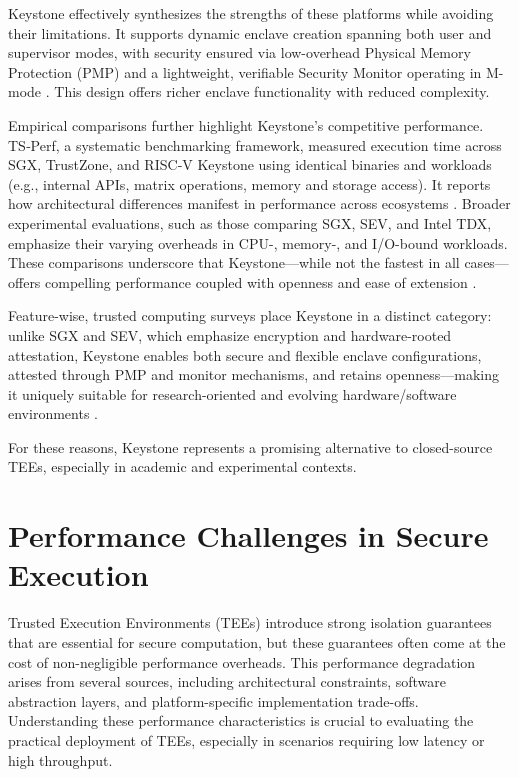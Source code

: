 Keystone effectively synthesizes the strengths of these platforms while avoiding their limitations. It supports dynamic enclave creation spanning both user and supervisor modes, with security ensured via low-overhead Physical Memory Protection (PMP) and a lightweight, verifiable Security Monitor operating in M-mode \cite{dayeol2019keystone}. This design offers richer enclave functionality with reduced complexity.

Empirical comparisons further highlight Keystone’s competitive performance. TS‑Perf, a systematic benchmarking framework, measured execution time across SGX, TrustZone, and RISC‑V Keystone using identical binaries and workloads (e.g., internal APIs, matrix operations, memory and storage access). It reports how architectural differences manifest in performance across ecosystems \cite{turn0search5}. Broader experimental evaluations, such as those comparing SGX, SEV, and Intel TDX, emphasize their varying overheads in CPU-, memory-, and I/O-bound workloads. These comparisons underscore that Keystone—while not the fastest in all cases—offers compelling performance coupled with openness and ease of extension \cite{turn0search2,turn0search10}.

Feature-wise, trusted computing surveys place Keystone in a distinct category: unlike SGX and SEV, which emphasize encryption and hardware-rooted attestation, Keystone enables both secure and flexible enclave configurations, attested through PMP and monitor mechanisms, and retains openness—making it uniquely suitable for research-oriented and evolving hardware/software environments \cite{turn0search9}.

For these reasons, Keystone represents a promising alternative to closed-source TEEs, especially in academic and experimental contexts.


\section{Performance Challenges in Secure Execution}

Trusted Execution Environments (TEEs) introduce strong isolation guarantees that are essential for secure computation, but these guarantees often come at the cost of non-negligible performance overheads. This performance degradation arises from several sources, including architectural constraints, software abstraction layers, and platform-specific implementation trade-offs. Understanding these performance characteristics is crucial to evaluating the practical deployment of TEEs, especially in scenarios requiring low latency or high throughput.

